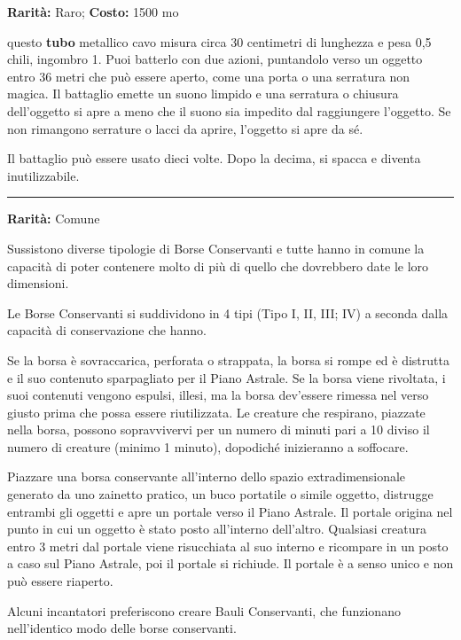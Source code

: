 \begin{multicols}{2}
\textbf{Rarità:} Raro; \textbf{Costo:} 1500 mo

questo \textbf{tubo} metallico cavo misura circa 30 centimetri di lunghezza e pesa 0,5 chili, ingombro 1. Puoi batterlo con due azioni, puntandolo verso un oggetto entro 36 metri che può essere aperto, come una porta o una serratura non magica. Il battaglio emette un suono limpido e una serratura o chiusura dell'oggetto si apre a meno che il suono sia impedito dal raggiungere l'oggetto. Se non rimangono serrature o lacci da aprire, l'oggetto si apre da sé.

Il battaglio può essere usato dieci volte. Dopo la decima, si spacca e diventa inutilizzabile.

\smallskip\noindent\rule{\linewidth}{2pt}  \hypertarget{BorsaConservante}{}\smallskip{}\noindent\label{BorsaConservante}

\textbf{Rarità:} Comune

Sussistono diverse tipologie di Borse Conservanti e tutte hanno in comune la capacità di poter contenere molto di più di quello che dovrebbero date le loro dimensioni.

Le Borse Conservanti si suddividono in 4 tipi (Tipo I, II, III; IV) a seconda dalla capacità di conservazione che hanno.

Se la borsa è sovraccarica, perforata o strappata, la borsa si rompe ed è distrutta e il suo contenuto sparpagliato per il Piano Astrale. Se la borsa viene rivoltata, i suoi contenuti vengono espulsi, illesi, ma la borsa dev'essere rimessa nel verso giusto prima che possa essere riutilizzata. Le creature che respirano, piazzate nella borsa, possono sopravvivervi per un numero di minuti pari a 10 diviso il numero di creature (minimo 1 minuto), dopodiché inizieranno a soffocare.

Piazzare una borsa conservante all'interno dello spazio extradimensionale generato da uno zainetto pratico, un buco portatile o simile oggetto, distrugge entrambi gli oggetti e apre un portale verso il Piano Astrale. Il portale origina nel punto in cui un oggetto è stato posto all'interno dell'altro. Qualsiasi creatura entro 3 metri dal portale viene risucchiata al suo interno e ricompare in un posto a caso sul Piano Astrale, poi il portale si richiude. Il portale è a senso unico e non può essere riaperto.

Alcuni incantatori preferiscono creare Bauli Conservanti, che funzionano nell'identico modo delle borse conservanti.


\end{multicols}
